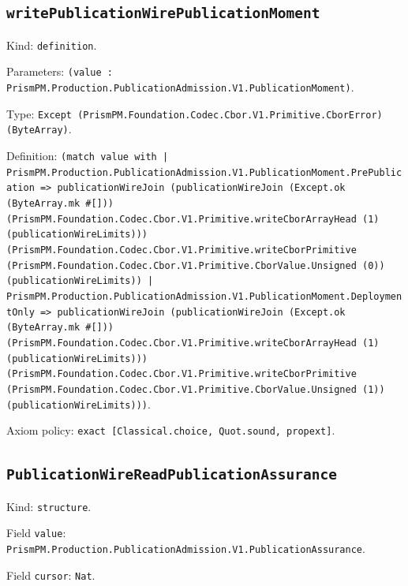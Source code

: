 \documentclass[11pt]{article}
\begin{document}
\subsection*{\texttt{writePublicationWirePublicationMoment}}
\noindent Kind: \texttt{definition}.\par
\noindent Parameters: \texttt{(value : PrismPM.Production.PublicationAdmission.V1.PublicationMoment)}.\par
\noindent Type: \texttt{Except (PrismPM.Foundation.Codec.Cbor.V1.Primitive.CborError) (ByteArray)}.\par
\noindent Definition: \texttt{(match value with | PrismPM.Production.PublicationAdmission.V1.PublicationMoment.PrePublication => publicationWireJoin (publicationWireJoin (Except.ok (ByteArray.mk \#[])) (PrismPM.Foundation.Codec.Cbor.V1.Primitive.writeCborArrayHead (1) (publicationWireLimits))) (PrismPM.Foundation.Codec.Cbor.V1.Primitive.writeCborPrimitive (PrismPM.Foundation.Codec.Cbor.V1.Primitive.CborValue.Unsigned (0)) (publicationWireLimits)) | PrismPM.Production.PublicationAdmission.V1.PublicationMoment.DeploymentOnly => publicationWireJoin (publicationWireJoin (Except.ok (ByteArray.mk \#[])) (PrismPM.Foundation.Codec.Cbor.V1.Primitive.writeCborArrayHead (1) (publicationWireLimits))) (PrismPM.Foundation.Codec.Cbor.V1.Primitive.writeCborPrimitive (PrismPM.Foundation.Codec.Cbor.V1.Primitive.CborValue.Unsigned (1)) (publicationWireLimits)))}.\par
\noindent Axiom policy: \texttt{exact [Classical.choice, Quot.sound, propext]}.\par
\subsection*{\texttt{PublicationWireReadPublicationAssurance}}
\noindent Kind: \texttt{structure}.\par
\noindent Field \texttt{value}: \texttt{PrismPM.Production.PublicationAdmission.V1.PublicationAssurance}.\par
\noindent Field \texttt{cursor}: \texttt{Nat}.\par
\end{document}

